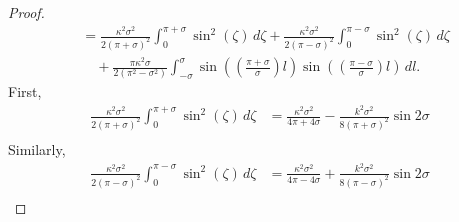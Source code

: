 \documentclass[11pt]{amsart}
\renewcommand{\k}{\kappa}
\theoremstyle{definition}
\theoremstyle{remark}
\numberwithin{equation}{section}
\begin{document}
\begin{proof}
\begin{equation*}
\begin{split}
		&=\frac{\k^2\sigma^2}{2(\pi+\sigma)^2}\int_{0}^{\pi+\sigma}\sin^2\left(\zeta\right)\,d\zeta+\frac{\k^2\sigma^2}{2(\pi-\sigma)^2}\int_{0}^{\pi-\sigma}\sin^2\left(\zeta\right)\,d\zeta\\
		&\quad+\frac{\pi \k^2\sigma}{2(\pi^2-\sigma^2)}\int_{-\sigma}^\sigma   \sin\left(\left(\frac{\pi+\sigma}{\sigma}\right)l\right)\sin\left(\left(\frac{\pi-\sigma}{\sigma}\right)l\right)\,dl.
	\end{split}
\end{equation*}
First,
\begin{equation*}
	\begin{split}
		\frac{\k^2\sigma^2}{2(\pi+\sigma)^2}\int_{0}^{\pi+\sigma}\sin^2\left(\zeta\right)\,d\zeta     
		&=\frac{\k^2\sigma^2}{4\pi+4\sigma}-\frac{k^2\sigma^2}{8(\pi+\sigma)^2}\sin2\sigma\\
	\end{split}
\end{equation*}
Similarly,
\begin{equation*}
	\begin{split}
		\frac{\k^2\sigma^2}{2(\pi-\sigma)^2}\int_{0}^{\pi-\sigma}\sin^2\left(\zeta\right)\,d\zeta     
		&=\frac{\k^2\sigma^2}{4\pi-4\sigma}+\frac{k^2\sigma^2}{8(\pi-\sigma)^2}\sin2\sigma\\
	\end{split}
\end{equation*}

\end{proof}
\end{document}
